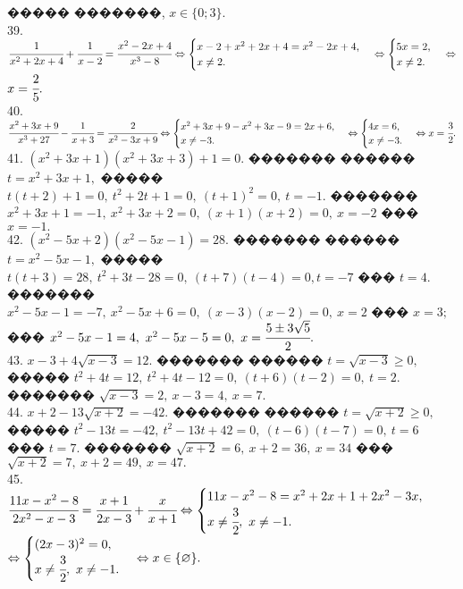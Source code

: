 \documentclass[12pt]{article}
\begin{document}
����� �������, $x\in\{0; 3\}.$\\
39. $\cfrac{1}{x^2+2x+4}+\cfrac{1}{x-2}=\cfrac{x^2-2x+4}{x^3-8}\Leftrightarrow \begin{cases}x-2+x^2+2x+4=x^2-2x+4,\\ x\neq2.\end{cases}
\Leftrightarrow \begin{cases}5x=2,\\ x\neq2.\end{cases}\Leftrightarrow$\\$ x=\cfrac{2}{5}.$\\
40. $\cfrac{x^2+3x+9}{x^3+27}-\cfrac{1}{x+3}=\cfrac{2}{x^2-3x+9}\Leftrightarrow \begin{cases}x^2+3x+9-x^2+3x-9=2x+6,\\ x\neq-3.\end{cases}
\Leftrightarrow\begin{cases} 4x=6,\\ x\neq-3.\end{cases}\Leftrightarrow x=\cfrac{3}{2}.$\\
41. $(x^2+3x+1)(x^2+3x+3)+1=0.$ ������� ������ $t=x^2+3x+1,$ ����� $t(t+2)+1=0,\ t^2+2t+1=0,\ (t+1)^2=0,\ t=-1.$ ������� $x^2+3x+1=-1,\
x^2+3x+2=0,\ (x+1)(x+2)=0,\ x=-2$ ��� $x=-1.$\\
42. $(x^2-5x+2)(x^2-5x-1)=28.$ ������� ������ $t=x^2-5x-1,$ ����� $t(t+3)=28,\ t^2+3t-28=0,\ (t+7)(t-4)=0, t=-7$ ��� $t=4.$ ������� $x^2-5x-1=-7,\ x^2-5x+6=0,\
(x-3)(x-2)=0,\ x=2$ ��� $x=3;$ ��� $x^2-5x-1=4,\ x^2-5x-5=0,\ x=\cfrac{5\pm3\sqrt{5}}{2}.$\\
43. $x-3+4\sqrt{x-3}=12.$ ������� ������ $t=\sqrt{x-3}\geqslant0,$ ����� $t^2+4t=12,\ t^2+4t-12=0,\ (t+6)(t-2)=0,\ t=2.$ ������� $\sqrt{x-3}=2,\ x-3=4,\ x=7.$\\
44. $x+2-13\sqrt{x+2}=-42.$ ������� ������ $t=\sqrt{x+2}\geqslant0,$ ����� $t^2-13t=-42,\ t^2-13t+42=0,\ (t-6)(t-7)=0,\ t=6$ ��� $t=7.$ ������� $\sqrt{x+2}=6,\ x+2=36,\ x=34$ ��� $\sqrt{x+2}=7,\ x+2=49,\ x=47.$\\
45. $\cfrac{11x-x^2-8}{2x^2-x-3}=\cfrac{x+1}{2x-3}+\cfrac{x}{x+1}\Leftrightarrow \begin{cases} 11x-x^2-8=x^2+2x+1+2x^2-3x,\\ x\neq\cfrac{3}{2},\ x\neq-1.\end{cases}$\\$
\Leftrightarrow \begin{cases} (2x-3)^2=0,\\ x\neq\cfrac{3}{2},\ x\neq-1.\end{cases}\Leftrightarrow x\in\{\varnothing\}.$\\
\end{document}
